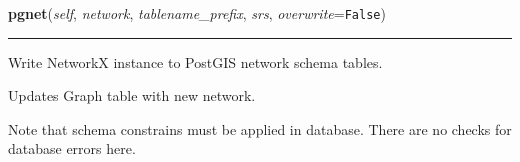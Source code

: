     \label{nx_pgnet:write:pgnet}

    \vspace{0.5ex}

\hspace{.8\funcindent}\begin{boxedminipage}{\funcwidth}

    \raggedright \textbf{pgnet}(\textit{self}, \textit{network}, \textit{tablename\_prefix}, \textit{srs}, \textit{overwrite}={\tt False})

    \vspace{-1.5ex}

    \rule{\textwidth}{0.5\fboxrule}
\setlength{\parskip}{2ex}
    Write NetworkX instance to PostGIS network schema tables.

    Updates Graph table with new network.

    Note that schema constrains must be applied in database. There are no 
    checks for database errors here.

\setlength{\parskip}{1ex}
    \end{boxedminipage}

